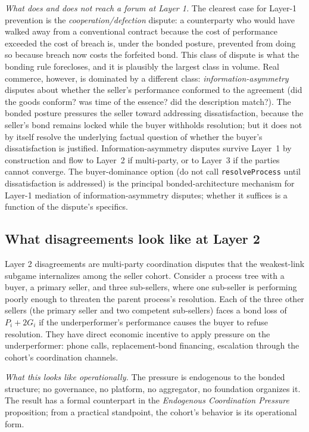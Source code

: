 \documentclass[11pt,a4paper]{article}
\theoremstyle{remark}
\begin{document}
\emph{What does and does not reach a forum at Layer 1.} The
clearest case for Layer-1 prevention is the
\emph{cooperation/defection} dispute: a counterparty who would
have walked away from a conventional contract because the cost of
performance exceeded the cost of breach is, under the bonded
posture, prevented from doing so because breach now costs the
forfeited bond. This class of dispute is what the bonding rule
forecloses, and it is plausibly the largest class in volume.
Real commerce, however, is dominated by a different class:
\emph{information-asymmetry} disputes about whether the seller's
performance conformed to the agreement (did the goods conform?
was time of the essence? did the description match?). The bonded
posture pressures the seller toward addressing dissatisfaction,
because the seller's bond remains locked while the buyer
withholds resolution; but it does not by itself resolve the
underlying factual question of whether the buyer's dissatisfaction
is justified. Information-asymmetry disputes survive Layer~1 by
construction and flow to Layer~2 if multi-party, or to Layer~3
if the parties cannot converge. The buyer-dominance option (do
not call \texttt{resolveProcess} until dissatisfaction is
addressed) is the principal bonded-architecture mechanism for
Layer-1 mediation of information-asymmetry disputes; whether it
suffices is a function of the dispute's specifics.

\subsection{What disagreements look like at Layer 2}

Layer 2 disagreements are multi-party coordination disputes that
the weakest-link subgame internalizes among the seller cohort.
Consider a process tree with a buyer, a primary seller, and three
sub-sellers, where one sub-seller is performing poorly enough to
threaten the parent process's resolution. Each of the three other
sellers (the primary seller and two competent sub-sellers) faces
a bond loss of $P_i + 2G_i$ if the underperformer's performance
causes the buyer to refuse resolution. They have
direct economic incentive to apply pressure on the underperformer:
phone calls, replacement-bond financing, escalation through the
cohort's coordination channels.

\emph{What this looks like operationally.} The pressure is
endogenous to the bonded structure; no governance, no platform,
no aggregator, no foundation organizes it. The result has a
formal counterpart in the \emph{Endogenous Coordination Pressure}
proposition; from a practical standpoint, the cohort's behavior
is its operational form.
\end{document}
